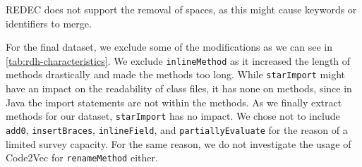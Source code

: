 \documentclass[%
class=scrreprt,
chapterprefix=false,%
open=right,%
twoside=true,%
paper=a4,%
logofile={Logo\_zentral\_farbig\_EN.png},%
thesistype=master,%
UKenglish,%
]{se2thesis}
\theoremstyle{definition}
\newcommand{\rdh}{REDEC\xspace}
\begin{document}
	
	\rdh does not support the removal of spaces, as this might cause keywords or identifiers to merge.
	

	For the final dataset, we exclude some of the modifications as we can see in \autoref{tab:rdh-characteristics}.
	We exclude \texttt{inlineMethod} as it increased the length of methods drastically and made the methods too long.
	While \texttt{starImport} might have an impact on the readability of class files, it has none on methods, since in Java the import statements are not within the methods. As we finally extract methods for our dataset, \texttt{starImport} has no impact.
	We chose not to include \texttt{add0}, \texttt{insertBraces}, \texttt{inlineField}, and \texttt{partiallyEvaluate} for the reason of a limited survey capacity.
	For the same reason, we do not investigate the usage of Code2Vec for \texttt{renameMethod} either.
\end{document}
